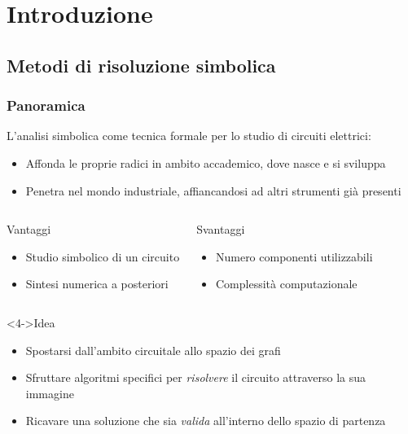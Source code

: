 
\section{Introduzione}

\subsection{Metodi di risoluzione simbolica}


\begin{frame}
 \frametitle{Panoramica}

 L'analisi simbolica come tecnica formale per lo studio di circuiti elettrici:
 \begin{itemize}
  \item Affonda le proprie radici in ambito accademico, dove nasce e si sviluppa
  \item Penetra nel mondo industriale, affiancandosi ad altri strumenti già presenti
 \end{itemize}

 \begin{columns}
   \begin{block}{Vantaggi}
     \begin{itemize}
      \item Studio simbolico di un circuito
      \item Sintesi numerica a posteriori
     \end{itemize}
   \end{block}
   \begin{block}{Svantaggi}
     \begin{itemize}
      \item Numero componenti utilizzabili
      \item Complessità computazionale
     \end{itemize}
   \end{block}
 \end{columns}

 \begin{block}<4->{Idea}
  \begin{itemize}
   \item Spostarsi dall'ambito circuitale allo spazio dei grafi
   \item Sfruttare algoritmi specifici per \textit{risolvere} il circuito attraverso la sua immagine
   \item Ricavare una soluzione che sia \textit{valida} all'interno dello spazio di partenza
  \end{itemize}
 \end{block}

\end{frame}

